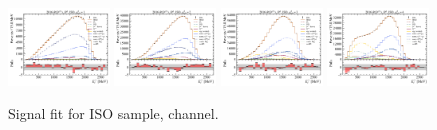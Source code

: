 \begin{figure}[htb]
    \includegraphics[width=0.24\textwidth]{./figs-fit-fit-results/sig-fit/lines_q2_slices/fit_result-lines_q2_idx1-D0-iso-el.pdf}
    \includegraphics[width=0.24\textwidth]{./figs-fit-fit-results/sig-fit/lines_q2_slices/fit_result-lines_q2_idx2-D0-iso-el.pdf}
    \includegraphics[width=0.24\textwidth]{./figs-fit-fit-results/sig-fit/lines_q2_slices/fit_result-lines_q2_idx3-D0-iso-el.pdf}
    \includegraphics[width=0.24\textwidth]{./figs-fit-fit-results/sig-fit/lines_q2_slices/fit_result-lines_q2_idx4-D0-iso-el.pdf}

    \caption{Signal fit for ISO sample, \Dz channel.}
    \label{fig:sig-d0}
\end{figure}

